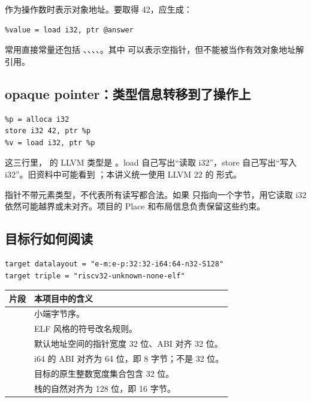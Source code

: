  作为操作数时表示对象地址。要取得 42，应生成：
\begin{lstlisting}
%value = load i32, ptr @answer
\end{lstlisting}
常用直接常量还包括 、、、、。其中  可以表示空指针，但不能被当作有效对象地址解引用。

\subsection{opaque pointer：类型信息转移到了操作上}
\begin{lstlisting}
%p = alloca i32
store i32 42, ptr %p
%v = load i32, ptr %p
\end{lstlisting}
这三行里， 的 LLVM 类型是 。load 自己写出“读取 i32”，store 自己写出“写入 i32”。旧资料中可能看到 ；本讲义统一使用 LLVM 22 的  形式。

指针不带元素类型，不代表所有读写都合法。如果  只指向一个字节，用它读取 i32 依然可能越界或未对齐。项目的 Place 和布局信息负责保留这些约束。

\subsection{目标行如何阅读}
\begin{lstlisting}[numbers=none]
target datalayout = "e-m:e-p:32:32-i64:64-n32-S128"
target triple = "riscv32-unknown-none-elf"
\end{lstlisting}
\begin{tabularx}{\linewidth}{@{}p{28mm}Y@{}}
\toprule
片段 & 本项目中的含义 \\
\midrule
{} & 小端字节序。\\
 & ELF 风格的符号改名规则。\\
 & 默认地址空间的指针宽度 32 位、ABI 对齐 32 位。\\
 & i64 的 ABI 对齐为 64 位，即 8 字节；不是 32 位。\\
 & 目标的原生整数宽度集合包含 32 位。\\
 & 栈的自然对齐为 128 位，即 16 字节。\\
\bottomrule
\end{tabularx}

